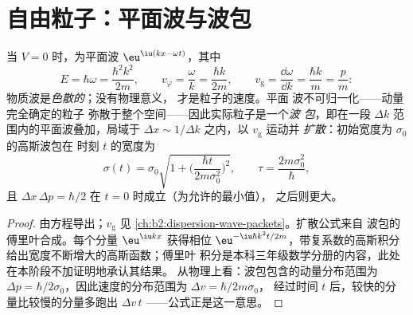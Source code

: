 \section{自由粒子：平面波与波包}

\begin{proposition}[自由粒子]\label{prop:b2:schrodinger-wave-functions:free}
当 $V = 0$ 时，为平面波 $\eu^{\iu(kx -
\omega t)}$，其中
\[
E = \hbar\omega = \frac{\hbar^2k^2}{2m}, \qquad
v_\varphi = \frac{\omega}{k} = \frac{\hbar k}{2m}, \qquad
v_{\text{g}} = \frac{\dd\omega}{\dd k} = \frac{\hbar k}{m} = \frac{p}{m} :
\]
物质波是\emph{色散的}；没有物理意义，
\emph{}才是粒子的速度。平面
波不可归一化——动量完全确定的粒子
弥散于整个空间——因此实际粒子是一个\emph{波
包}，即在一段
$\Delta k$ 范围内的平面波叠加，局域于 $\Delta x \sim 1/\Delta k$ 之内，以 $v_{\text{g}}$ 运动并
\emph{扩散}：初始宽度为 $\sigma_0$ 的高斯波包在
时刻 $t$ 的宽度为
\[
\sigma(t) = \sigma_0\sqrt{1 + \Big(\frac{\hbar t}{2m\sigma_0^2}\Big)^2}, \qquad
\tau = \frac{2m\sigma_0^2}{\hbar} ,
\]
且 $\Delta x\,\Delta p = \hbar/2$ 在 $t = 0$ 时成立（为允许的最小值），
之后则更大。
\end{proposition}

\begin{proof}
由方程导出；$v_{\text{g}}$ 见
\cref{ch:b2:dispersion-wave-packets}。扩散公式来自
波包的傅里叶合成。每个分量 $\eu^{\iu kx}$
获得相位 $\eu^{-\iu\hbar k^2t/2m}$，带复系数的高斯积分
给出宽度不断增大的高斯函数；傅里叶
积分是本科三年级数学分册的内容，此处在本阶段不加证明地承认其结果。
从物理上看：波包包含的动量分布范围为 $\Delta p
= \hbar/2\sigma_0$，因此速度的分布范围为 $\Delta v = \hbar/2m\sigma_0$，
经过时间 $t$ 后，较快的分量比较慢的分量多跑出 $\Delta v\,t$
——公式正是这一意思。
\end{proof}

